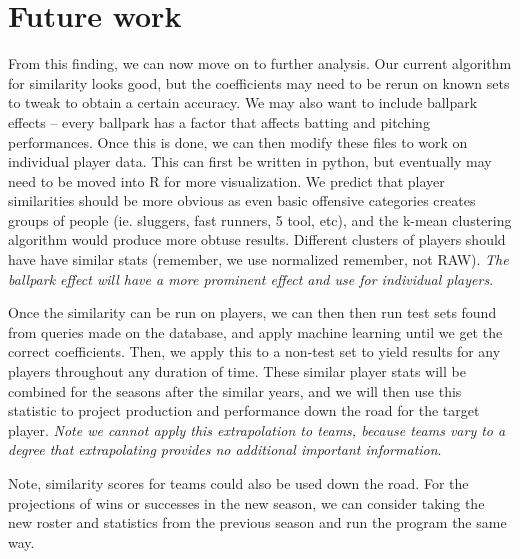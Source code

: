 \documentclass[12pt]{article}
\numberwithin{equation}{subsection}
\begin{document}
\section{Future work}
From this finding, we can now move on to further analysis. Our current algorithm for similarity looks good, but the coefficients may need to be rerun on known sets to tweak to obtain a certain accuracy. We may also want to include ballpark effects -- every ballpark has a factor that affects batting and pitching performances. Once this is done, we can then modify these files to work on individual player data. This can first be written in python, but eventually may need to be moved into R for more visualization. We predict that player similarities should be more obvious as even basic offensive categories creates groups of people (ie. sluggers, fast runners, 5 tool, etc), and the k-mean clustering algorithm would produce more obtuse results. Different clusters of players should have have similar stats (remember, we use normalized remember, not RAW). \textit{The ballpark effect will have a more prominent effect and use for individual players}.

Once the similarity can be run on players, we can then then run test sets found from queries made on the database, and apply machine learning until we get the correct coefficients. Then, we apply this to a non-test set to yield results for any players throughout any duration of time. These similar player stats will be combined for the seasons after the similar years, and we will then use this statistic to project production and performance down the road for the target player. \textit{Note we cannot apply this extrapolation to teams, because teams vary to a degree that extrapolating provides no additional important information}.

Note, similarity scores for teams could also be used down the road. For the projections of wins or successes in the new season, we can consider taking the new roster and statistics from the previous season and run the program the same way.

\pagebreak
\end{document}
